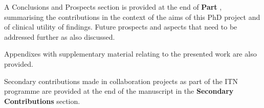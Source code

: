 A Conclusions and Prospects section is provided at the end of \textbf{Part }, summarising the contributions in the context of the aims of this PhD project and of clinical utility of findings. Future prospects and aspects that need to be addressed further as also discussed.

Appendixes with supplementary material relating to the presented work are also provided.

Secondary contributions made in collaboration projects as part of the ITN programme are provided at the end of the manuscript in the \textbf{Secondary Contributions} section.